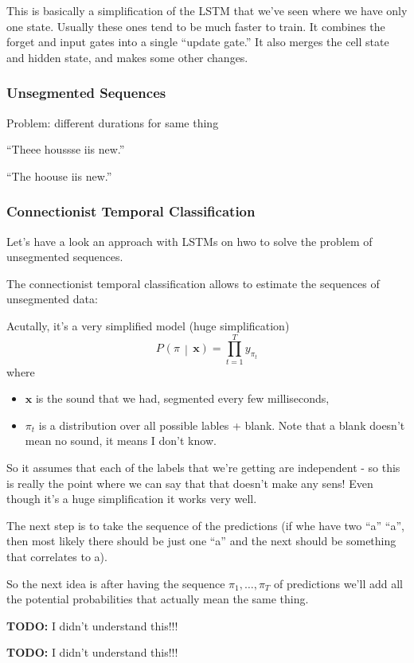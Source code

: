 \documentclass[a2paper,8pt]{extarticle}
\newcommand{\cProb}[3][]{P_{#1}\left( #2 \,\middle|\, #3 \right)}
\renewcommand{\vec}[1]{\mathbf{#1}}
\newcommand{\vx}{\vec{x}}
\newcommand{\todo}[1]{\textbf{TODO:} #1}
\newcommand{\todo}[1]{%
}
\begin{document}
\begin{landscape}
\begin{multicols*}{7}
This is basically a simplification of the LSTM that we've seen where we have
only one state. Usually these ones tend to be much faster to train. It combines
the forget and input gates into a single ``update gate.'' It also merges the
cell state and hidden state, and makes some other changes.

\subsubsection{Unsegmented Sequences}

Problem: different durations for same thing

``Theee houssse iis new.''

``The hoouse iis new.''


\subsubsection{Connectionist Temporal Classification}

Let's have a look an approach with LSTMs on hwo to solve the problem of
unsegmented sequences.

The connectionist temporal classification allows to estimate the sequences of
unsegmented data:

Acutally, it's a very simplified model (huge simplification)
\[
\cProb{\pi}{\vx}=\prod_{t=1}^T y_{\pi_t}
\]
where
\begin{itemize}
  \item $\vx$ is the sound that we had, segmented every few milliseconds,
  \item $\pi_t$ is a distribution over all possible lables + blank. Note that a
  blank doesn't mean no sound, it means I don't know.
\end{itemize} 
So it assumes that each of the labels that we're getting are independent - so
this is really the point where we can say that that doesn't make any sens! Even
though it's a huge simplification it works very well.

The next step is to take the sequence of the predictions (if whe have two ``a''
``a'', then most likely there should be just one ``a'' and the next should be
something that correlates to a).

So the next idea is after having the sequence $\pi_1,\ldots,\pi_T$ of
predictions we'll add all the potential probabilities that actually mean the
same thing.

\todo{I didn't understand this!!!}

\todo{I didn't understand this!!!}


\end{multicols*}
\end{landscape}
\end{document}
